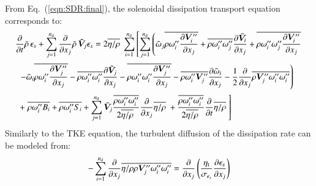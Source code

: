 \documentclass{warpdoc}
\newcommand{\alb}{\vspace{0.2cm}\\} %
\newcommand{\nd}{{{n}_{\rm d}}}
\newcommand{\turb}{_{\rm t}}
\newcommand{\etat}{{\eta\turb}}
\newcommand{\mfd}{\displaystyle}
\begin{document}
From Eq.\ (\ref{eqn:SDR:final}), the solenoidal dissipation transport
equation corresponds to:
%
\begin{equation}
 \begin{array}{l}
         \mfd \frac{\partial }{\partial t} \wbar{\rho}\, \epsilon_s
        +\mfd\sum_{j=1}^{\nd}
           \frac{\partial }{\partial x_j} \wbar{\rho}\, {\wtilde{\bm{V}}_j} \epsilon_s
 = 
   2 \overline{\eta/\rho}~ \mfd\sum_{i=1}^{\nd} \left[ \mfd\sum_{j=1}^{\nd}
    \mfd\left(
         {\wtilde{\omega}_j} \overline{\rho  \omega_i^{{\prime\prime}}  \frac{\partial \bm{V}_i^{{\prime\prime}}}{\partial x_j}}
             + \overline{\rho  \omega_i^{{\prime\prime}}  \omega_j^{{\prime\prime}}} \frac{\partial {\wtilde{\bm{V}}_i}}{\partial x_j}
             + \overline{\rho  \omega_i^{{\prime\prime}}  \omega_j^{{\prime\prime}} \frac{\partial \bm{V}_i^{{\prime\prime}}}{\partial x_j}}
    \right. \right.\alb~~
    \mfd\left.
       - {\wtilde{\omega}_i} \overline{\rho  \omega_i^{{\prime\prime}}  \frac{\partial \bm{V}_j^{{\prime\prime}}}{\partial x_j}}
             - \overline{\rho  \omega_i^{{\prime\prime}}  \omega_i^{{\prime\prime}}} \frac{\partial {\wtilde{\bm{V}}_j}}{\partial x_j}
             - \overline{\rho  \omega_i^{{\prime\prime}}  \omega_i^{{\prime\prime}} \frac{\partial \bm{V}_j^{{\prime\prime}}}{\partial x_j}}
       - \overline{\rho \omega_i^{{\prime\prime}} \bm{V}_j^{{\prime\prime}}}  \frac{\partial {\wtilde{\omega}_i}}{\partial x_j}
       - \frac{1}{2} \frac{\partial }{\partial x_j} \overline{\rho {\bm{V}_j^{{\prime\prime}}} \omega_i^{{\prime\prime}} \omega_i^{{\prime\prime}}}
    \right) \alb~~
 + \mfd\left.
         \mfd \overline{\rho \omega_i^{{\prime\prime}} B_i}
       + \overline{\rho \omega_i^{{\prime\prime}} S_i}
       + \sum_{j=1}^\nd{\wtilde{\bm{V}}_j} \frac{\overline{\rho \omega_i^{{\prime\prime}} \omega_i^{{\prime\prime}}}}{2 \overline{\eta/\rho}~} \frac{\partial }{\partial x_j}  \overline{\eta/\rho}~
       + \frac{\overline{\rho \omega_i^{{\prime\prime}} \omega_i^{{\prime\prime}}}}{2 \overline{\eta/\rho}~} \frac{\partial }{\partial t} \overline{\eta/\rho}~
    \right] 
 \end{array}
\label{eqn:SDR:modeled:1}
\end{equation}
%
Similarly to the TKE equation, the turbulent diffusion of the dissipation rate can be modeled from:
%
\begin{equation}
 -\sum_{i=1}^\nd \frac{\partial}{\partial x_j}\overline{\eta / \rho} \overline{\rho {\bm{V}_j^{{\prime\prime}}} \omega_i^{{\prime\prime}} \omega_i^{{\prime\prime}}}
   = \frac{\partial}{\partial x_j} \left( \frac{\etat}{\sigma_{\epsilon_s}} \frac{\partial \epsilon_s}{\partial x_j} \right)
\end{equation}
\end{document}
